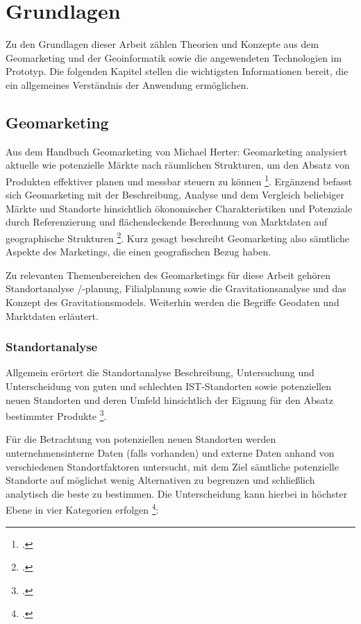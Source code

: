 \chapter{Grundlagen}
Zu den Grundlagen dieser Arbeit zählen Theorien und Konzepte aus dem Geomarketing und der Geoinformatik sowie die angewendeten Technologien im Prototyp.
Die folgenden Kapitel stellen die wichtigsten Informationen bereit, die ein allgemeines Verständnis der Anwendung ermöglichen.

\section{Geomarketing}
Aus dem Handbuch Geomarketing von Michael Herter: 
Geomarketing analysiert aktuelle wie potenzielle Märkte nach räumlichen Strukturen, um den Absatz von Produkten effektiver planen und messbar steuern zu können \footcite{herter_handbuch_2018}.
Ergänzend befasst sich Geomarketing mit der Beschreibung, Analyse und dem Vergleich beliebiger Märkte und Standorte hinsichtlich ökonomischer Charakteristiken und Potenziale durch Referenzierung und flächendeckende Berechnung von Marktdaten auf geographische Strukturen \footcite{geomarketing_def}.
Kurz gesagt beschreibt Geomarketing also sämtliche Aspekte des Marketings, die einen geografischen Bezug haben.

Zu relevanten Themenbereichen des Geomarketings für diese Arbeit gehören Standortanalyse /-planung, Filialplanung sowie die Gravitationsanalyse und das Konzept des Gravitationsmodels.
Weiterhin werden die Begriffe Geodaten und Marktdaten erläutert.

\subsection{Standortanalyse}
Allgemein erörtert die Standortanalyse Beschreibung, Untersuchung und Unterscheidung von guten und schlechten IST-Standorten sowie potenziellen neuen Standorten und deren Umfeld hinsichtlich der Eignung für den Absatz bestimmter Produkte \footcite{geomarketing_standortanalyse}.

Für die Betrachtung von potenziellen neuen Standorten werden unternehmensinterne Daten (falls vorhanden) und externe Daten anhand von verschiedenen Standortfaktoren untersucht, mit dem Ziel sämtliche potenzielle Standorte auf möglichst wenig Alternativen zu begrenzen und schließlich analytisch die beste zu bestimmen. 
Die Unterscheidung kann hierbei in höchster Ebene in vier Kategorien erfolgen \footcite{haas_standortfaktoren}:

